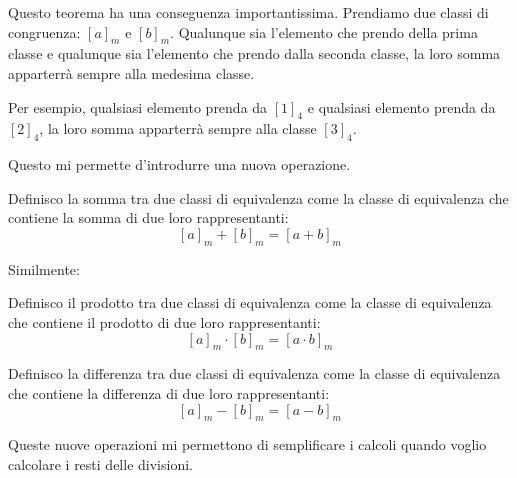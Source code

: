 Questo teorema ha una conseguenza importantissima.
Prendiamo due classi di congruenza: $[a]_m$ e $[b]_m$.
Qualunque sia l'elemento che prendo della prima classe e qualunque sia l'elemento che prendo dalla seconda classe, la loro somma apparterrà sempre alla medesima classe.

Per esempio, qualsiasi elemento prenda da $[1]_4$ e qualsiasi elemento prenda da $[2]_4$, la loro somma apparterrà sempre alla classe $[3]_4$.

Questo mi permette d'introdurre una nuova operazione.

\begin{definizione}
    Definisco la somma tra due classi di equivalenza come la classe di equivalenza che contiene la somma di due loro rappresentanti:
    \begin{equation}
        \label{eq:somma} [a]_m + [b]_m = [a + b]_m
    \end{equation}
\end{definizione}

Similmente:

\begin{definizione}
    Definisco il prodotto tra due classi di equivalenza come la classe di equivalenza che contiene il prodotto di due loro rappresentanti:
    \begin{equation}
        \label{eq:prodotto} [a]_m \cdot [b]_m = [a \cdot b]_m
    \end{equation}
\end{definizione}

\begin{definizione}
    Definisco la differenza tra due classi di equivalenza come la classe di equivalenza che contiene la differenza di due loro rappresentanti:
    \begin{equation}
        \label{eq:differenza} [a]_m - [b]_m = [a - b]_m
    \end{equation}
\end{definizione}

Queste nuove operazioni mi permettono di semplificare i calcoli quando voglio calcolare i resti delle divisioni.

